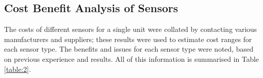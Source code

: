 \documentclass[preprint,authoryear,12pt]{elsarticle}
\begin{document}

\subsection{Cost Benefit Analysis of Sensors}
    The costs of different sensors for a single unit were collated by contacting various manufacturers and suppliers; these results were used to estimate cost ranges for each sensor type. The benefits and issues for each sensor type were noted, based on previous experience and results. All of this information is summarised in Table \ref{table:2}.
\end{document}
